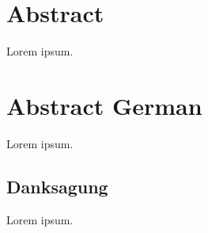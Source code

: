 \chapter*{Abstract}

Lorem ipsum.

\clearpage \chapter*{Abstract German}

Lorem ipsum.

\clearpage \section*{Danksagung}

Lorem ipsum.